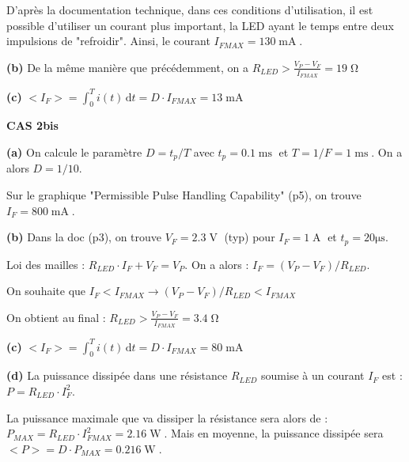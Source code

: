 \documentclass[a4paper,french]{paper}
\begin{document}
D'après la documentation technique, dans ces conditions d'utilisation, il est possible d'utiliser un courant plus important, la LED ayant le temps entre deux impulsions de "refroidir". Ainsi, le courant $I_{FMAX} = 130\operatorname{mA}$.

\textbf{(b)} De la même manière que précédemment, on a $R_{LED} > \frac{V_P - V_F}{I_{FMAX}} = 19\operatorname{\Omega}$

\textbf{(c)} $\displaystyle <I_F> = \int_{0}^{T} i(t) \, \mathrm{d}t = D \cdot I_{FMAX} = 13\operatorname{mA}$

\qquad

\textbf{\large CAS 2bis}

\textbf{(a)} On calcule le paramètre $D = t_p / T$ avec $t_p = 0.1\operatorname{ms}$ et $T = 1/F = 1\operatorname{ms}$. On a alors $D = 1/10$.

Sur le graphique "Permissible Pulse Handling Capability" (p5), on trouve $I_F = 800\operatorname{mA}$.

\textbf{(b)} Dans la doc (p3), on trouve $V_F = 2.3\operatorname{V}$ (typ) pour $I_F = 1\operatorname{A}$ et $t_p =
20\operatorname{\mu{}s}$.

Loi des mailles : $R_{LED} \cdot I_F + V_F = V_P$. On a alors : $I_F = (V_P - V_F) / R_{LED}$.

On souhaite que $I_F < I_{FMAX} \rightarrow (V_P - V_F) / R_{LED} < I_{FMAX}$

On obtient au final : $R_{LED} > \frac{V_P - V_F}{I_{FMAX}} = 3.4\operatorname{\Omega}$


\textbf{(c)} $\displaystyle <I_F> = \int_{0}^{T} i(t) \, \mathrm{d}t = D \cdot I_{FMAX} = 80\operatorname{mA}$

\textbf{(d)} La puissance dissipée dans une résistance $R_{LED}$ soumise à un courant $I_F$ est : $P = R_{LED} \cdot I_F^2$.

La puissance maximale que va dissiper la résistance sera alors de : $P_{MAX} = R_{LED} \cdot I_{FMAX}^2 = 2.16\operatorname{W}$. Mais en moyenne, la puissance dissipée sera $<P> = D \cdot P_{MAX} = 0.216\operatorname{W}$.




\end{document}
